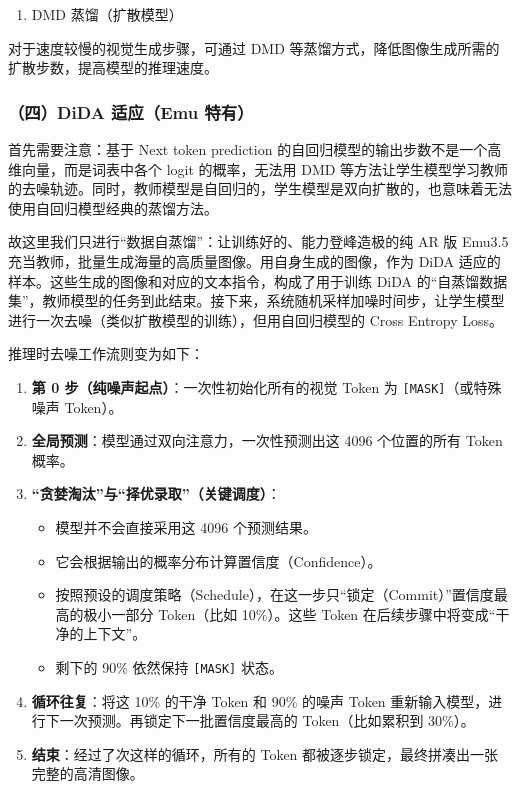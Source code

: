 \begin{enumerate}
\def\labelenumi{\arabic{enumi}.}
\setcounter{enumi}{2}
\tightlist
\item
  DMD 蒸馏（扩散模型）
\end{enumerate}

对于速度较慢的视觉生成步骤，可通过 DMD 等蒸馏方式，降低图像生成所需的扩散步数，提高模型的推理速度。

\hypertarget{ux56dbdida-ux9002ux5e94emu-ux7279ux6709}{%
\subsubsection{（四）DiDA 适应（Emu 特有）}\label{ux56dbdida-ux9002ux5e94emu-ux7279ux6709}}

首先需要注意：基于 Next token prediction 的自回归模型的输出步数不是一个高维向量，而是词表中各个 logit 的概率，无法用 DMD 等方法让学生模型学习教师的去噪轨迹。同时，教师模型是自回归的，学生模型是双向扩散的，也意味着无法使用自回归模型经典的蒸馏方法。

故这里我们只进行``数据自蒸馏''：让训练好的、能力登峰造极的纯 AR 版 Emu3.5 充当教师，批量生成海量的高质量图像。用自身生成的图像，作为 DiDA 适应的样本。这些生成的图像和对应的文本指令，构成了用于训练 DiDA 的``自蒸馏数据集''，教师模型的任务到此结束。接下来，系统随机采样加噪时间步，让学生模型进行一次去噪（类似扩散模型的训练），但用自回归模型的 Cross Entropy Loss。

推理时去噪工作流则变为如下：

\begin{enumerate}
\def\labelenumi{\arabic{enumi}.}
\tightlist
\item
  \textbf{第 0 步（纯噪声起点）}：一次性初始化所有的视觉 Token 为 \texttt{{[}MASK{]}}（或特殊噪声 Token）。
\item
  \textbf{全局预测}：模型通过双向注意力，一次性预测出这 4096 个位置的所有 Token 概率。
\item
{}
  \textbf{``贪婪淘汰''与``择优录取''（关键调度）}：

  \begin{itemize}
  \tightlist
  \item
    模型并不会直接采用这 4096 个预测结果。
  \item
    它会根据输出的概率分布计算置信度（Confidence）。
  \item
    按照预设的调度策略（Schedule），在这一步只``锁定（Commit）''置信度最高的极小一部分 Token（比如 10\%）。这些 Token 在后续步骤中将变成``干净的上下文''。
  \item
    剩下的 90\% 依然保持 \texttt{{[}MASK{]}} 状态。
  \end{itemize}
\item
  \textbf{循环往复}：将这 10\% 的干净 Token 和 90\% 的噪声 Token 重新输入模型，进行下一次预测。再锁定下一批置信度最高的 Token（比如累积到 30\%）。
\item
  \textbf{结束}：经过了次这样的循环，所有的 Token 都被逐步锁定，最终拼凑出一张完整的高清图像。
\end{enumerate}

